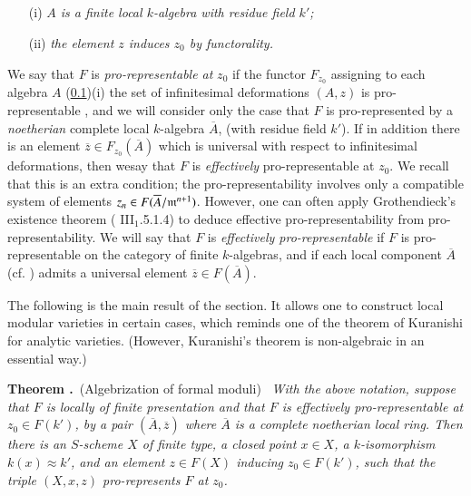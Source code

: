 \subsection{}\label{art02-sec5.1}
\begin{itemize}
\item[(i)] {\em $A$ is a finite local $k$-algebra with residue field $k'$;}

\item[(ii)] {\em the element $z$ induces $z_{0}$ by functorality.}
\end{itemize}
We say that $F$ is {\em pro-representable at} $z_{0}$ if the functor $F_{z_{0}}$ assigning to each algebra $A$ (\ref{art02-sec5.1})(i) the set of infinitesimal deformations $(A,z)$ is pro-representable \cite{art02-key11}, and we will consider only the case that $F$ is pro-represented by a {\em noetherian} complete local $k$-algebra $\overline{A}$, (with residue field $k'$). If in addition there is an element $\overline{z}\in F_{z_{0}}(\overline{A})$ which is universal with respect to infinitesimal deformations, then we\pageoriginale say that $F$ is {\em effectively} pro-representable at $z_{0}$. We recall that this is an extra condition; the pro-representability involves only a compatible system of elements $z_{n}\in F(\overline{A}/\mathfrak{m}^{n+1})$. However, one can often apply Grothendieck's existence theorem (\cite{art02-key8} III$_{1}$.5.1.4) to deduce effective pro-representability from pro-representability. We will say that $F$ is {\em effectively pro-represen\-table} if $F$ is pro-representable on the category of finite $k$-algebras, and if each local component $\overline{A}$ (cf. \cite{art02-key11}) admits a universal element $\overline{z}\in F(\overline{A})$.

The following is the main result of the section. It allows one to construct local modular varieties in certain cases, which reminds one of the theorem of Kuranishi \cite{art02-key20} for analytic varieties. (However, Kuranishi's theorem is non-algebraic in an essential way.)

\medskip
\noindent
{\bf Theorem .\label{art02-thm5.2}}~(Algebrization of formal moduli)~
{\em With the above notation, suppose that $F$ is locally of finite presentation and that $F$ is effectively pro-representable at $z_{0}\in F(k')$, by a pair $(\overline{A},\overline{z})$ where $\overline{A}$ is a complete noetherian local ring. Then there is an $S$-scheme $X$ of finite type, a closed point $x\in X$, a $k$-isomorphism $k(x)\approx k'$, and an element $z\in F(X)$ inducing $z_{0}\in F(k')$, such that the triple $(X,x,z)$ pro-represents $F$ at $z_{0}$.}
\smallskip

